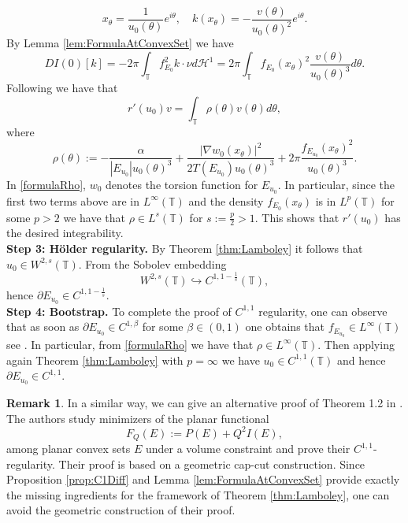 \documentclass[11pt]{article}
\theoremstyle{plain}
\numberwithin{equation}{section}
\theoremstyle{definition}
\newtheorem{remark}[theorem]{Remark}
\let\oldendproof\endproof
\renewenvironment{proof}[1][\proofname]{%
\oldproof[\upshape \bfseries #1]%
}{\oldendproof}
\def \p{\partial}
\def \mc{\mathcal}
\def \mb{\mathbb}
\begin{document}
\begin{proof}[Proof of Theorem \ref{thm:HalphaReg}]
\[        x_\theta=\frac{1}{u_0(\theta)}e^{i\theta},\quad k(x_\theta)=-\frac{v(\theta)}{u_0(\theta)^2}e^{i\theta}.
        \]
        By Lemma \ref{lem:FormulaAtConvexSet} we have
        \begin{equation}
            DI(0)[k]=-2\pi\int_{\mb T}f_{E_0}^2k\cdot \nu d\mc H^1=2\pi\int_{\mb T}f_{E_0}(x_\theta)^2\frac{v(\theta)}{u_0(\theta)^3}d\theta.
        \end{equation}
        Following \cite[Proposition 3.13]{lamboley2012regularity} we have that
        \[
        r'(u_0)v=\int_{\mb T}\rho(\theta)v(\theta)d\theta,
        \]
        where
        \begin{equation}
            \label{formulaRho}
            \rho(\theta):=-\frac{\alpha}{|E_{u_0}|u_0(\theta)^3}+\frac{|\nabla w_0(x_\theta)|^2}{2 T(E_{u_0})u_0(\theta)^3}+2\pi \frac{f_{E_{u_0}}(x_\theta)^2}{u_0(\theta)^3}.
        \end{equation}
        In \eqref{formulaRho}, $w_0$ denotes the torsion function for $E_{u_0}$. In particular, since the first two terms above are in $L^\infty(\mb T)$ and the density $f_{E_0}(x_\theta)$ is in $L^p(\mb T)$ for some $p>2$ we have that $\rho \in L^{s}(\mb T)$ for $s:=\frac p2>1$. This shows that $r'(u_0)$ has the desired integrability.\\
        \textbf{Step 3: Hölder regularity.} By Theorem \ref{thm:Lamboley} it follows that $u_0 \in W^{2,s}(\mb T)$. From the Sobolev embedding
        \[
        W^{2,s}(\mb T)\hookrightarrow C^{1,1-\frac1s}(\mb T),
        \]
        hence $\p E_{u_0} \in  C^{1,1-\frac1s}$.\\
        \textbf{Step 4: Bootstrap.} To complete the proof of $C^{1,1}$ regularity, one can observe that as soon as $\p E_{u_0}\in C^{1,\beta}$ for some $\beta \in (0,1)$ one obtains that $f_{E_{u_0}} \in L^\infty(\mb T)$ see \cite[Lemma 3.6]{goldman2018minimizers}. In particular, from \eqref{formulaRho} we have that $\rho \in L^\infty(\mb T)$. Then applying again Theorem \ref{thm:Lamboley} with $p=\infty$ we have $u_0\in C^{1,1}(\mb T)$ and hence $\p E_{u_0} \in C^{1,1}$.
    \end{proof}

    \begin{remark}
        In a similar way, we can give an alternative proof of Theorem 1.2 in \cite{goldman2018minimizers}. The authors study minimizers of the planar functional
        \[
        F_Q(E):=P(E)+Q^2I(E),
        \]
        among planar convex sets $E$ under a volume constraint and prove their $C^{1,1}$-regularity. Their proof is based on a geometric cap-cut construction. Since Proposition \ref{prop:C1Diff} and Lemma \ref{lem:FormulaAtConvexSet} provide exactly the missing ingredients for the framework of Theorem \ref{thm:Lamboley}, one can avoid the geometric construction of their proof.
    \end{remark}
\end{document}
